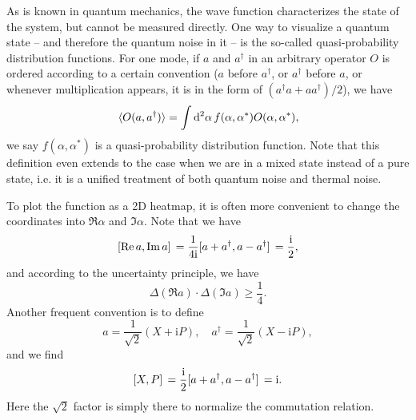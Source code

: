 \documentclass[hyperref, a4paper]{article}
\newcommand*{\ii}{\mathrm{i}}
\begin{document}
As is known in quantum mechanics,
the wave function characterizes the state of the system,
but cannot be measured directly.
One way to visualize a quantum state -- and therefore the quantum noise in it --
is the so-called quasi-probability distribution functions.
For one mode, if $a$ and $a^\dagger$ in an arbitrary operator $O$ is ordered according to a certain convention
($a$ before $a^\dagger$, or $a^\dagger$ before $a$, 
or whenever multiplication appears, it is in the form of $(a^\dagger a + a a^\dagger) / 2$), 
we have 
\begin{equation}
    \expval*{O(a, a^\dagger)} = \int \dd[2]{\alpha} f(\alpha, \alpha^*) O(\alpha, \alpha^*),
\end{equation}
we say $f(\alpha, \alpha^*)$ is a quasi-probability distribution function.
Note that this definition even extends to the case 
when we are in a mixed state instead of a pure state, 
i.e. it is a unified treatment of both quantum noise and thermal noise.

To plot the function as a 2D heatmap,
it is often more convenient to change the coordinates into $\Re \alpha$ and $\Im \alpha$.
Note that we have 
\begin{equation}
    \comm*{\Re a}{\Im a} = \frac{1}{4 \ii} \comm*{a + a^\dagger}{a - a^\dagger}
    = \frac{\ii}{2},
\end{equation}
and according to the uncertainty principle, we have 
\begin{equation}
    \Delta (\Re a) \cdot \Delta (\Im a) \geq \frac{1}{4}.
    \label{eq:re-im-fluctuation}
\end{equation}
Another frequent convention is to define 
\begin{equation}
    a = \frac{1}{\sqrt{2}} (X + \ii P), \quad 
    a^\dagger = \frac{1}{\sqrt{2}} (X - \ii P),
    \label{eq:xy-to-a}
\end{equation}
and we find 
\begin{equation}
    \comm*{X}{P} = \frac{\ii}{2} \comm*{a + a^\dagger}{a - a^\dagger} = \ii.
\end{equation}
Here the $\sqrt{2}$ factor is simply there to normalize the commutation relation.
\end{document}
